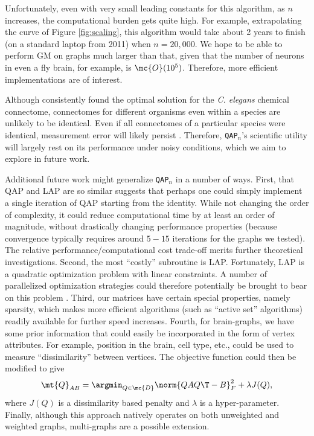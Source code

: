 \documentclass[10pt,journal,cspaper,compsoc]{IEEEtran}
\begin{document}
Unfortunately, even with very small leading constants for this algorithm, as $n$ increases, the computational burden gets quite high.  For example, extrapolating the curve of Figure \ref{fig:scaling}, this algorithm would take about 2 years to finish (on a standard laptop from 2011) when $n=20,000$.  We hope to be able to perform GM on graphs much larger than that, given that the number of neurons in even a fly brain, for example, is $\mc{O}(10^5)$.  Therefore, more efficient implementations are of interest.  

Although \qapn consistently found the optimal solution for the \emph{C. elegans} chemical connectome, connectomes for different organisms even within a species are unlikely to be identical. Even if all connectomes of a particular species were identical, measurement error will likely persist \cite{Helmstaedter2011}. Therefore, \texttt{QAP}$_n$'s scientific utility will largely rest on its performance under noisy conditions, which we aim to explore in future work.  

Additional future work might generalize \texttt{QAP}$_n$ in a number of ways.  First, that QAP and LAP are so similar suggests that perhaps one could simply implement a single iteration of QAP starting from the identity.  While not changing the order of complexity, it could reduce computational time by at least an order of magnitude, without drastically changing performance properties (because convergence typically requires around $5-15$ iterations for the graphs we tested).  The relative performance/computational cost trade-off merits further theoretical investigations.  Second, the most ``costly'' subroutine is LAP.  Fortunately, LAP is a quadratic optimization problem with linear constraints.  A number of parallelized optimization strategies could therefore potentially be brought to bear on this problem \cite{Boyd2011}.  Third, our matrices have certain special properties, namely sparsity, which makes more efficient algorithms (such as ``active set'' algorithms) readily available for further speed increases.  Fourth, for brain-graphs, we have some prior information that could easily be incorporated in the form of vertex attributes.  For example, position in the brain, cell type, etc., could be used to measure ``dissimilarity'' between vertices.  The objective function could then be modified to give
\begin{align} \label{eq:Jqap}
	\mt{Q}_{AB}= \argmin_{Q \in \mc{D}} \norm{Q A Q\T - B}^2_F + \lambda J(Q),
\end{align}
where $J(Q)$ is a dissimilarity based penalty and $\lambda$ is a hyper-parameter.  Finally, although this approach natively operates on both unweighted and weighted graphs, multi-graphs are a possible extension.
\end{document}
